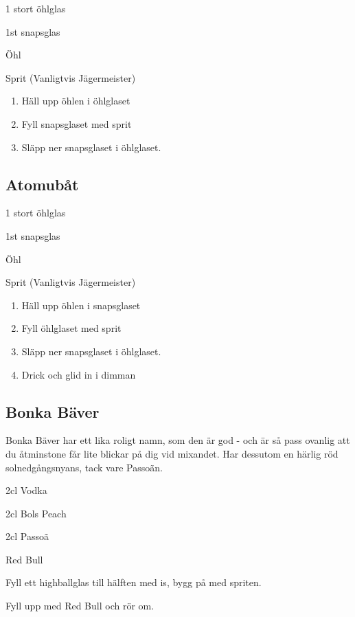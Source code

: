 1 stort öhlglas

1st snapsglas

Öhl

Sprit (Vanligtvis Jägermeister)

\begin{enumerate}
    \item Häll upp öhlen i öhlglaset
    \item Fyll snapsglaset med sprit
    \item Släpp ner snapsglaset i öhlglaset.
\end{enumerate}

\filbreak
\subsection{\textbf{Atomubåt}}

1 stort öhlglas

1st snapsglas

Öhl

Sprit (Vanligtvis Jägermeister)

\begin{enumerate}
    \item Häll upp öhlen i snapsglaset
    \item Fyll öhlglaset med sprit
    \item Släpp ner snapsglaset i öhlglaset.
    \item Drick och glid in i dimman
\end{enumerate}
\filbreak
\subsection{\textbf{Bonka Bäver}}

Bonka Bäver har ett lika roligt namn, som den är god - och är så pass ovanlig att du åtminstone får lite blickar på dig vid mixandet. Har dessutom en härlig röd solnedgångsnyans, tack vare Passoãn.

2cl Vodka

2cl Bols Peach

2cl Passoã

Red Bull

Fyll ett highballglas till hälften med is, bygg på med spriten.

Fyll upp med Red Bull och rör om.

\newpage
